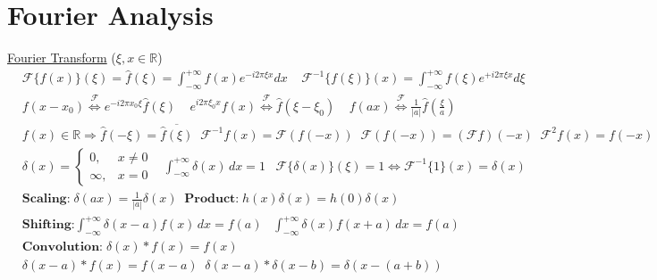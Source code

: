 \section*{\normalsize Fourier Analysis}
\underline{Fourier Transform}{\normalfont\scriptsize \; ($\xi, x\in \mathbb{R}$)}
\begin{align*}
&\mathcal{F}\{f(x)\}(\xi) \!=\!\hat f(\xi) \!= \!\int_{-\infty}^{+\infty}\!f(x)e^{-i 2\pi \xi x}  dx \; \;\; \; \mathcal{F}^{-1}\{f(\xi)\}(x) = \int_{-\infty}^{+\infty}\! f(\xi)e^{+i2\pi\xi x}d\xi \\
&f(x-x_0)\stackrel{\mathcal{F}}{\Longleftrightarrow} e^{-i2\pi x_0\xi} \hat f(\xi)\; \; \;\;  e^{i2\pi\xi_0 x}f(x) \stackrel{\mathcal{F}}{\Longleftrightarrow} \hat{f}(\xi-\xi_0)\; \; \; \; f(ax) \stackrel{\mathcal{F}}{\Longleftrightarrow}\frac{1}{|a|}\hat{f}\left( \frac{\xi}{a}\right)\\
&f(x)\!\in\! \mathbb{R}\!\Rightarrow \!\hat{f}(-\xi)\!=\! \overline{\hat{f}(\xi)} \; \; \mathcal{F}^{-\!1}\!f(x) \!=\! \mathcal{F}(f(-x)\!) \;\; \mathcal{F}(f(-x)\!)\!=\!(\mathcal{F}f)(-x)\; \; \mathcal{F}^2\!f(x)\!=\!f(-x)
\end{align*}
\underline{}
\begin{align*}
&\delta(x) = \begin{cases}
0, & x \ne 0 \\
\infty, & x = 0
\end{cases}\;\;\;
\int_{-\infty}^{+\infty} \delta(x) \, dx = 1 \; \; \; \mathcal{F}\{\delta(x)\}(\xi) = 1\Leftrightarrow \mathcal{F}^{-1}\{1\}(x)=\delta(x)\\
&\textbf{Scaling:} \; \delta(ax) = \frac{1}{|a|} \delta(x) \; \;\textbf{Product:}   \; 
h(x) \delta(x) = h(0) \delta(x)\\
&\textbf{Shifting:}
\int_{-\infty}^{+\infty} \delta(x - a) f(x) \, dx = f(a)\; \; \;  \int_{-\infty}^{+\infty} \delta(x) f(x + a) \, dx = f(a)\\
&\textbf{Convolution:}\; 
\delta(x) * f(x) = f(x)\\
&\delta(x - a) * f(x) = f(x - a)\; \; \delta(x - a) * \delta(x - b) = \delta(x - (a + b))\\
\end{align*}
